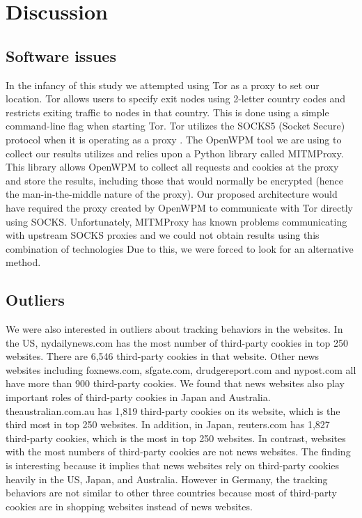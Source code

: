 \documentclass[conference]{IEEEtran}
\begin{document}
\section{Discussion}
\subsection{Software issues}
In the infancy of this study we attempted using Tor as a proxy to set our location. Tor allows users to specify exit nodes using 2-letter country codes and restricts exiting traffic to nodes in that country. This is done using a simple command-line flag when starting Tor. Tor utilizes the SOCKS5 (Socket Secure) protocol when it is operating as a proxy \cite{torsocks5}. The OpenWPM tool we are using to collect our results utilizes and relies upon a Python library called MITMProxy. This library allows OpenWPM to collect all requests and cookies at the proxy and store the results, including those that would normally be encrypted (hence the man-in-the-middle nature of the proxy). Our proposed architecture would have required the proxy created by OpenWPM to communicate with Tor directly using SOCKS. Unfortunately, MITMProxy has known problems communicating with upstream SOCKS proxies and we could not obtain results using this combination of technologies \cite{MITM} Due to this, we were forced to look for an alternative method.

\subsection{Outliers}
We were also interested in outliers about tracking behaviors in the websites. In the US, nydailynews.com has the most number of third-party cookies in top 250 websites. There are 6,546 third-party cookies in that website. Other news websites including foxnews.com, sfgate.com, drudgereport.com and nypost.com all have more than 900 third-party cookies. We found that news websites also play important roles of third-party cookies in Japan and Australia. theaustralian.com.au has 1,819 third-party cookies on its website, which is the third most in top 250 websites. In addition, in Japan, reuters.com has 1,827 third-party cookies, which is the most in top 250 websites.  In contrast, websites with the most numbers of third-party cookies are not news websites. The finding is interesting because it implies that news websites rely on third-party cookies heavily in the US, Japan, and Australia. However in Germany, the tracking behaviors are not similar to other three countries because most of third-party cookies are in shopping websites instead of news websites.  
\end{document}
